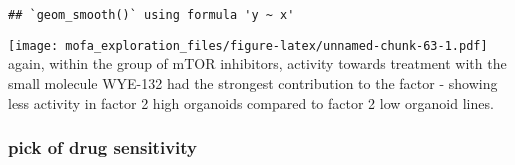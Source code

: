 \documentclass[
]{article}
\newenvironment{Shaded}{\begin{snugshade}}{\end{snugshade}}
\newcommand{\DataTypeTok}[1]{\textcolor[rgb]{0.13,0.29,0.53}{#1}}
\newcommand{\DecValTok}[1]{\textcolor[rgb]{0.00,0.00,0.81}{#1}}
\newcommand{\KeywordTok}[1]{\textcolor[rgb]{0.13,0.29,0.53}{\textbf{#1}}}
\newcommand{\NormalTok}[1]{#1}
\newcommand{\OperatorTok}[1]{\textcolor[rgb]{0.81,0.36,0.00}{\textbf{#1}}}
\newcommand{\OtherTok}[1]{\textcolor[rgb]{0.56,0.35,0.01}{#1}}
\newcommand{\StringTok}[1]{\textcolor[rgb]{0.31,0.60,0.02}{#1}}
\begin{document}
\begin{verbatim}
## `geom_smooth()` using formula 'y ~ x'
\end{verbatim}

\texttt{[image: mofa\_exploration\_files/figure-latex/unnamed-chunk-63-1.pdf]}
again, within the group of mTOR inhibitors, activity towards treatment
with the small molecule WYE-132 had the strongest contribution to the
factor - showing less activity in factor 2 high organoids compared to
factor 2 low organoid lines.

\hypertarget{pick-of-drug-sensitivity-1}{%
\subsubsection{pick of drug
sensitivity}\label{pick-of-drug-sensitivity-1}}

\begin{Shaded}
\end{Shaded}
\end{document}
